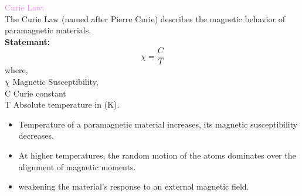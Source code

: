 \documentclass{beamer}
\begin{document}
\begin{frame}
\textcolor{violet}{Curie Law:}\\
The Curie Law (named after Pierre Curie) describes the magnetic behavior of paramagnetic materials. \\
\textbf{Statemant:} \\
\[
\chi = \frac{C}{T}
\]
where,\\
 $\chi$ Magnetic Susceptibility,\\
C Curie constant\\

T Absolute temperature in (K).\\
\begin{itemize}
\item Temperature of a paramagnetic material increases, its magnetic susceptibility decreases. 
\item At higher temperatures, the random motion of the atoms dominates over the alignment of magnetic moments.
\item  weakening the material's response to an external magnetic field.
\end{itemize}

\end{frame}
\end{document}

